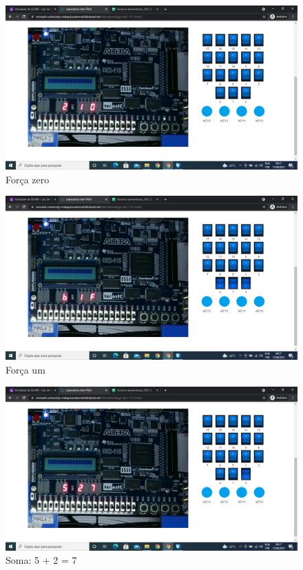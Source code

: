 \documentclass{article}
\begin{document}
\begin{center}

\begin{figure}
\includegraphics[width=\textwidth]{img/labsland_forca_zero.png}
\caption{Força zero}
\end{figure}

\begin{figure}
\includegraphics[width=\textwidth]{img/labsland_forca_1.png}
\caption{Força um}
\end{figure}

\begin{figure}
\includegraphics[width=\textwidth]{img/labsland_soma.png}
\caption{Soma: 5 + 2 = 7}
\end{figure}


\end{center}
\end{document}
